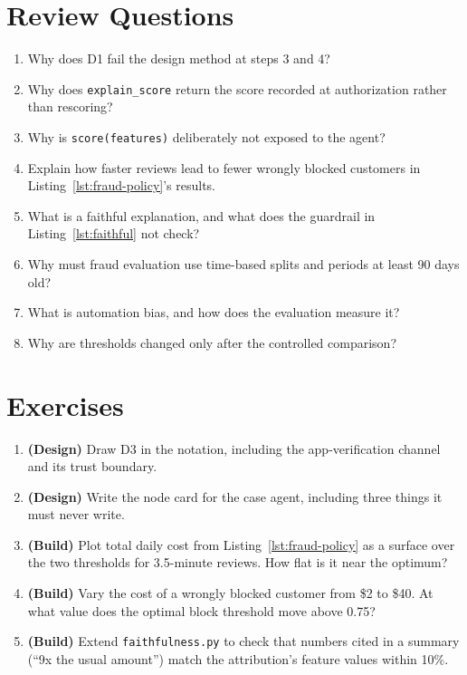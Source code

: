 \section*{Review Questions}

\begin{enumerate}[itemsep=2pt]
  \item Why does D1 fail the design method at steps 3 and 4?
  \item Why does \texttt{explain\_score} return the score recorded at authorization rather than rescoring?
  \item Why is \texttt{score(features)} deliberately not exposed to the agent?
  \item Explain how faster reviews lead to fewer wrongly blocked customers in Listing~\ref{lst:fraud-policy}'s results.
  \item What is a faithful explanation, and what does the guardrail in Listing~\ref{lst:faithful} not check?
  \item Why must fraud evaluation use time-based splits and periods at least 90 days old?
  \item What is automation bias, and how does the evaluation measure it?
  \item Why are thresholds changed only after the controlled comparison?
\end{enumerate}

\section*{Exercises}

\begin{enumerate}[itemsep=2pt]
  \item \textbf{(Design)} Draw D3 in the notation, including the app-verification channel and its trust boundary.
  \item \textbf{(Design)} Write the node card for the case agent, including three things it must never write.
  \item \textbf{(Build)} Plot total daily cost from Listing~\ref{lst:fraud-policy} as a surface over the two thresholds for 3.5-minute reviews. How flat is it near the optimum?
  \item \textbf{(Build)} Vary the cost of a wrongly blocked customer from \$2 to \$40. At what value does the optimal block threshold move above 0.75?
  \item \textbf{(Build)} Extend \texttt{faithfulness.py} to check that numbers cited in a summary (``9x the usual amount'') match the attribution's feature values within 10\%.
\end{enumerate}

